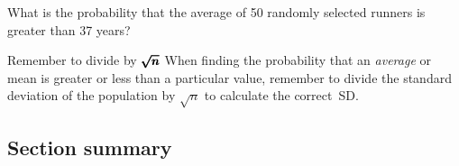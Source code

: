 \begin{exercisewrap}
\begin{nexercise}
What is the probability that the average of 50 randomly selected runners is greater than 37 years?\footnotemark
\end{nexercise}
\end{exercisewrap}

\begin{onebox}{Remember to divide by $\pmb{\sqrt{\MakeLowercase{n}}}$}
When finding the probability that an \emph{average} or mean is greater or less than a particular value, remember to divide the standard deviation of the population by $\sqrt{n}$ to calculate the correct~SD.\end{onebox}


\D{\newpage}

\subsection*{Section summary}

